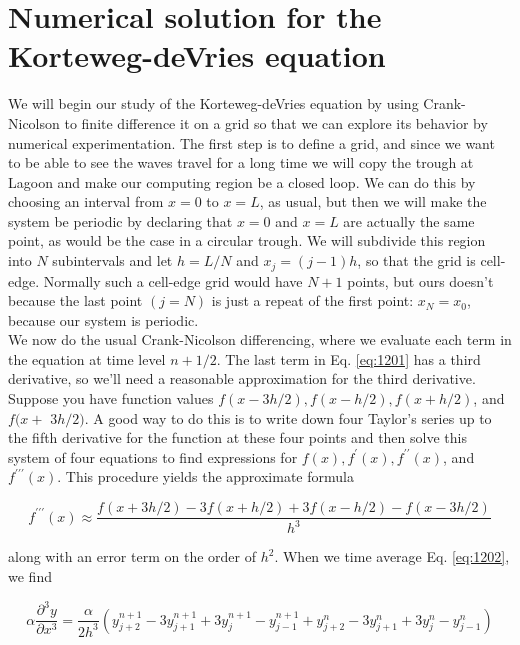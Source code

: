 \section*{Numerical solution for the \\ Korteweg-deVries equation}
We will begin our study of the Korteweg-deVries equation by using Crank-Nicolson to finite difference it on a grid so that we can explore its behavior by numerical experimentation. The first step is to define a grid, and since we want to be able to see the waves travel for a long time we will copy the trough at Lagoon and make our computing region be a closed loop. We can do this by choosing an interval from $x=0$ to $x=L$, as usual, but then we will make the system be periodic by declaring that $x=0$ and $x=L$ are actually the same point, as would be the case in a circular trough. We will subdivide this region into $N$ subintervals and let $h=L / N$ and $x_{j}=(j-1) h$, so that the grid is cell-edge. Normally such a cell-edge grid would have $N+1$ points, but ours doesn't because the last point $(j=N)$ is just a repeat of the first point: $x_{N}=x_{0}$, because our system is periodic.\\
We now do the usual Crank-Nicolson differencing, where we evaluate each term in the equation at time level $n+1 / 2$. The last term in Eq. \ref{eq:1201} has a third derivative, so we\rq ll need a reasonable approximation for the third derivative. Suppose you have function values $f(x-3 h / 2), f(x-h / 2), f(x+h / 2)$, and $f(x+$ $3 h / 2)$. A good way to do this is to write down four Taylor's series up to the fifth derivative for the function at these four points and then solve this system of four equations to find expressions for $f(x), f^{\prime}(x), f^{\prime \prime}(x)$, and $f^{\prime \prime \prime}(x)$. This procedure yields the approximate formula

\begin{equation}\label{eq:1202}
f^{\prime \prime \prime}(x) \approx \frac{f(x+3 h / 2)-3 f(x+h / 2)+3 f(x-h / 2)-f(x-3 h / 2)}{h^{3}}
\end{equation}

along with an error term on the order of $h^{2}$. When we time average Eq. \ref{eq:1202}, we find

\begin{equation}\label{eq:1203}
\alpha \frac{\partial^{3} y}{\partial x^{3}}=\frac{\alpha}{2 h^{3}}\left(y_{j+2}^{n+1}-3 y_{j+1}^{n+1}+3 y_{j}^{n+1}-y_{j-1}^{n+1}+y_{j+2}^{n}-3 y_{j+1}^{n}+3 y_{j}^{n}-y_{j-1}^{n}\right)
\end{equation}

